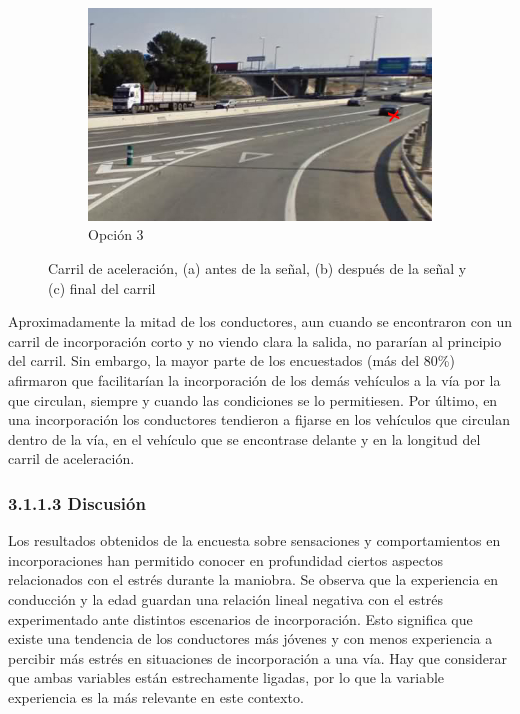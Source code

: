 \begin{figure}[htb]
\begin{subfigure}[b]{0.45\textwidth}
    \includegraphics[width=\textwidth]{figures/3.1c.jpg}
    \caption{Opción 3}
    \label{fig:3.1c}
  \end{subfigure}
  \caption{Carril de aceleración, (a) antes de la señal, (b) después de la señal y (c) final del carril}
  \label{fig:3.1}
\end{figure}

Aproximadamente la mitad de los conductores, aun cuando se encontraron con un carril de incorporación corto y no viendo clara la salida, no pararían al principio del carril. Sin embargo, la mayor parte de los encuestados (más del 80\%) afirmaron que facilitarían la incorporación de los demás vehículos a la vía por la que circulan, siempre y cuando las condiciones se lo permitiesen. Por último, en una incorporación los conductores tendieron a fijarse en los vehículos que circulan dentro de la vía, en el vehículo que se encontrase delante y en la longitud del carril de aceleración. 

\subsubsection{3.1.1.3 Discusión}\label{3113}

Los resultados obtenidos de la encuesta sobre sensaciones y comportamientos en incorporaciones han permitido conocer en profundidad ciertos aspectos relacionados con el estrés durante la maniobra. Se observa que la experiencia en conducción y la edad guardan una relación lineal negativa con el estrés experimentado ante distintos escenarios de incorporación. Esto significa que existe una tendencia de los conductores más jóvenes y con menos experiencia a percibir más estrés en situaciones de incorporación a una vía. Hay que considerar que ambas variables están estrechamente ligadas, por lo que la variable experiencia es la más relevante en este contexto. 

